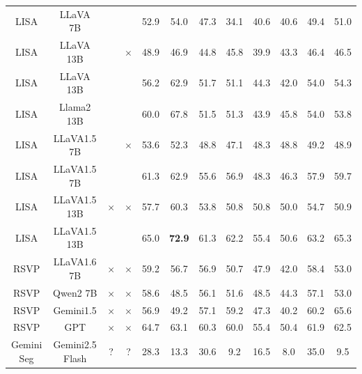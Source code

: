 \documentclass[]{fairmeta}
\begin{document}
\begin{table}[h]
{\begin{NiceTabular}{cccccccccccc}
			LISA           & LLaVA 7B          & \checkmark & \checkmark & 52.9 & 54.0 & 47.3 & 34.1 & 40.6 & 40.6 & 49.4 & 51.0 \\
			LISA           & LLaVA 13B         & \checkmark & $\times$ & 48.9 & 46.9 & 44.8 & 45.8 & 39.9 & 43.3 & 46.4 & 46.5 \\
			LISA           & LLaVA 13B         & \checkmark & \checkmark & 56.2 & 62.9 & 51.7 & 51.1 & 44.3 & 42.0 & 54.0 & 54.3 \\
			LISA           & Llama2 13B        & \checkmark & \checkmark & 60.0 & 67.8 & 51.5 & 51.3 & 43.9 & 45.8 & 54.0 & 53.8 \\
			LISA           & LLaVA1.5 7B       & \checkmark & $\times$ & 53.6 & 52.3 & 48.8 & 47.1 & 48.3 & 48.8 & 49.2 & 48.9 \\
			LISA           & LLaVA1.5 7B       & \checkmark & \checkmark & 61.3 & 62.9 & 55.6 & 56.9 & 48.3 & 46.3 & 57.9 & 59.7 \\
			LISA           & LLaVA1.5 13B      & $\times$ & $\times$ & 57.7 & 60.3 & 53.8 & 50.8 & 50.8 & 50.0 & 54.7 & 50.9 \\
			LISA           & LLaVA1.5 13B      & \checkmark & \checkmark & 65.0 & \textbf{72.9} & 61.3 & 62.2 & 55.4 & 50.6 & 63.2 & 65.3 \\
			RSVP           & LLaVA1.6 7B       & $\times$ & $\times$ & 59.2 & 56.7 & 56.9 & 50.7 & 47.9 & 42.0 & 58.4 & 53.0 \\
			RSVP           & Qwen2 7B& $\times$ & $\times$ & 58.6 & 48.5 & 56.1 & 51.6 & 48.5 & 44.3 & 57.1 & 53.0 \\
			RSVP           & Gemini1.5 & $\times$ & $\times$ & 56.9 & 49.2 & 57.1 & 59.2 & 47.3 & 40.2 & 60.2 & 65.6 \\
			RSVP           & GPT     & $\times$ & $\times$ & 64.7 & 63.1 & 60.3 & 60.0 & 55.4 & 50.4 & 61.9 & 62.5 \\
			Gemini Seg     & Gemini2.5 Flash   & ? & ? & 28.3 & 13.3 & 30.6 & 9.2 & 16.5 & 8.0 & 35.0 & 9.5 \\
			

\end{NiceTabular}}
\end{table}
\end{document}
